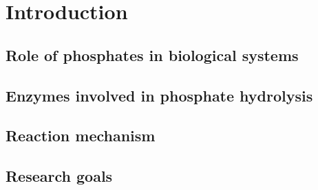 \chapter{Introduction}

\section{Role of phosphates in biological systems}
 


\section{Enzymes involved in phosphate hydrolysis}



\section{Reaction mechanism}



\section{Research goals}


